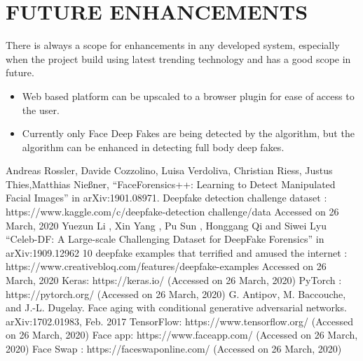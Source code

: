 \documentclass[12 pt]{article}
\begin{document}
\section{FUTURE ENHANCEMENTS}
There is always a scope for enhancements in any developed system, especially
when the project build using latest trending technology and has a good scope in
future.
\begin{itemize}
    \item Web based platform can be upscaled to a browser plugin for ease of access to
          the user.
    \item Currently only Face Deep Fakes are being detected by the algorithm, but the
          algorithm can be enhanced in detecting full body deep fakes.
\end{itemize}
\newpage

\begin{thebibliography}{99}
    Andreas Rossler, Davide Cozzolino, Luisa Verdoliva, Christian Riess, Justus
    Thies,Matthias Nießner, “FaceForensics++: Learning to Detect Manipulated Facial
    Images” in arXiv:1901.08971.
    Deepfake detection challenge dataset : https://www.kaggle.com/c/deepfake-detection challenge/data Accessed on 26 March, 2020
     Yuezun Li , Xin Yang , Pu Sun , Honggang Qi and Siwei Lyu “Celeb-DF: A
    Large-scale Challenging Dataset for DeepFake Forensics” in arXiv:1909.12962
    10 deepfake examples that terrified and amused the internet :
    https://www.creativebloq.com/features/deepfake-examples Accessed on 26 March,
    2020
    Keras: https://keras.io/ (Accessed on 26 March, 2020)
    PyTorch : https://pytorch.org/ (Accessed on 26 March, 2020)
    G. Antipov, M. Baccouche, and J.-L. Dugelay. Face aging with conditional generative adversarial networks. arXiv:1702.01983, Feb. 2017
     TensorFlow: https://www.tensorflow.org/ (Accessed on 26 March, 2020)
    Face app: https://www.faceapp.com/ (Accessed on 26 March, 2020)
    Face Swap : https://faceswaponline.com/ (Accessed on 26 March, 2020)

\end{thebibliography}
\end{document}
